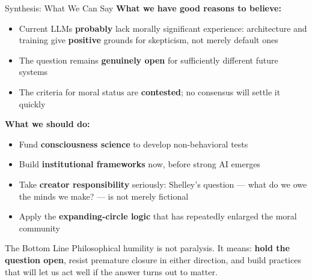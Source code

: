 \documentclass[aspectratio=169,11pt]{beamer}
\begin{document}
\begin{frame}[shrink=8]{Synthesis: What We Can Say}
\textbf{What we have good reasons to believe:}
\begin{itemize}
    \item Current LLMs \textbf{probably} lack morally significant experience: architecture and training give \textbf{positive} grounds for skepticism, not merely default ones
    \item The question remains \textbf{genuinely open} for sufficiently different future systems
    \item The criteria for moral status are \textbf{contested}; no consensus will settle it quickly
\end{itemize}

\textbf{What we should do:}
\begin{itemize}
    \item Fund \textbf{consciousness science} to develop non-behavioral tests
    \item Build \textbf{institutional frameworks} now, before strong AI emerges
    \item Take \textbf{creator responsibility} seriously: Shelley's question --- what do we owe the minds we make? --- is not merely fictional
    \item Apply the \textbf{expanding-circle logic} that has repeatedly enlarged the moral community
\end{itemize}

\begin{alertblock}{The Bottom Line}
\scriptsize
Philosophical humility is not paralysis. It means: \textbf{hold the question open}, resist premature closure in either direction, and build practices that will let us act well if the answer turns out to matter.
\end{alertblock}
\end{frame}
\end{document}
